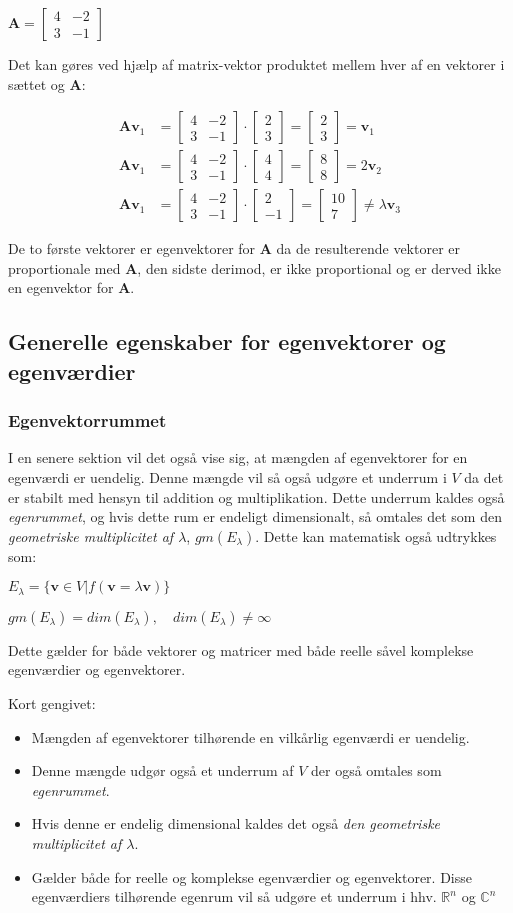 \documentclass{article}
\newcommand{\cent}[1]{\begin{center}#1\end{center}}
\newcommand{\mAlign}[1]{\begin{align*}#1\end{align*}}
\newcommand{\vekt}[2]{\ensuremath{\begin{bmatrix} #1\\ #2\end{bmatrix}}}
\newcommand{\smallMatrix}[4]{\ensuremath{\begin{bmatrix}
			#1 & #2 \\
			#3 & #4
\end{bmatrix}}}
\begin{document}
	\cent{$ \textbf{A} = \smallMatrix{4}{-2}{3}{-1} $}
	
	Det kan gøres ved hjælp af matrix-vektor produktet mellem hver af en vektorer i sættet og $ \textbf{A} $:
	
	\mAlign{\textbf{A} \textbf{v}_1 &= \smallMatrix{4}{-2}{3}{-1} \cdot \vekt{2}{3} = \vekt{2}{3} = \textbf{v}_1 \\
		\textbf{A} \textbf{v}_1 &= \smallMatrix{4}{-2}{3}{-1} \cdot \vekt{4}{4} = \vekt{8}{8} = 2\textbf{v}_2 \\ 
		\textbf{A} \textbf{v}_1 &= \smallMatrix{4}{-2}{3}{-1} \cdot \vekt{2}{-1} = \vekt{10}{7} \neq \lambda \textbf{v}_3}
	
	De to første vektorer er egenvektorer for $ \textbf{A} $ da de resulterende vektorer er proportionale med $ \textbf{A} $, den sidste derimod, er ikke proportional og er derved ikke en egenvektor for $ \textbf{A} $.
	
	\subsection{Generelle egenskaber for egenvektorer og egenværdier}
	\subsubsection{Egenvektorrummet}
	I en senere sektion vil det også vise sig, at mængden af egenvektorer for en egenværdi er uendelig. Denne mængde vil så også udgøre et underrum i $V$ da det er stabilt med hensyn til addition og multiplikation. Dette underrum kaldes også \textit{egenrummet}, og hvis dette rum er endeligt dimensionalt, så omtales det som den \textit{geometriske multiplicitet af $\lambda$}, $gm(E_\lambda)$. Dette kan matematisk også udtrykkes som:
	
	\cent{$ E_\lambda = \{ \textbf{v} \in V | f(\textbf{v} = \lambda \textbf{v}) \}$}
	\cent{$ gm(E_\lambda) = dim(E_\lambda), \quad dim(E_\lambda)\neq \infty $}
	
	Dette gælder for både vektorer og matricer med både reelle såvel komplekse egenværdier og egenvektorer.
	
	Kort gengivet:
	
	\begin{itemize}
		\item Mængden af egenvektorer tilhørende en vilkårlig egenværdi er uendelig.
		\item Denne mængde udgør også et underrum af $V$ der også omtales som \textit{egenrummet}.
		\item Hvis denne er endelig dimensional kaldes det også \textit{den geometriske multiplicitet af $\lambda$}.
		\item Gælder både for reelle og komplekse egenværdier og egenvektorer.
		\subitem Disse egenværdiers tilhørende egenrum vil så udgøre et underrum i hhv. $ \mathbb{R}^n $ og $ \mathbb{C}^n $
	\end{itemize}
\end{document}
